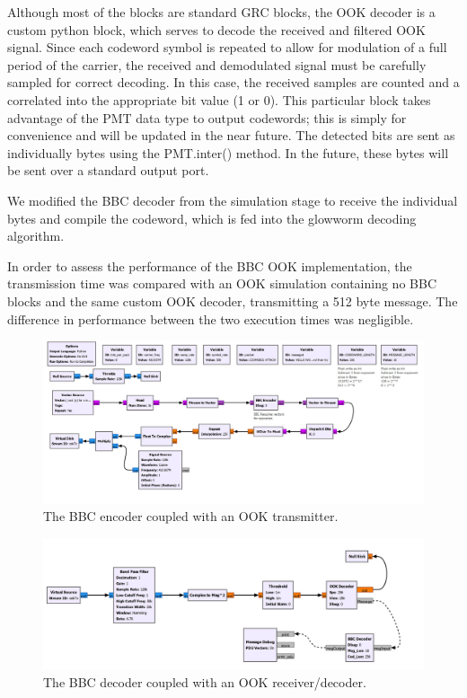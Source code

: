 \documentclass[conference]{IEEEtran}
\begin{document}
{Although most of the blocks are standard GRC blocks, the OOK decoder is a custom python block, which serves to decode the received and filtered OOK signal. Since each codeword symbol is repeated to allow for modulation of a full period of the carrier, the received and demodulated signal must be carefully sampled for correct decoding. In this case, the received samples are counted and a correlated into the appropriate bit value (1 or 0). This particular block takes advantage of the PMT data type to output codewords; this is simply for convenience and will be updated in the near future. The detected bits are sent as individually bytes using the PMT.inter() method. In the future, these bytes will be sent over a standard output port. 

We modified the BBC decoder from the simulation stage to receive the individual bytes and compile the codeword, which is fed into the glowworm decoding algorithm. 

In order to assess the performance of the BBC OOK implementation, the transmission time was compared with an OOK simulation containing no BBC blocks and the same custom OOK decoder, transmitting a 512 byte message. The difference in performance between the two execution times was negligible.


\begin{figure}
    \centering
    \includegraphics[scale=0.25]{./figures/bbc_ook_1}
    \caption{The BBC encoder coupled with an OOK transmitter.}
    \label{fig:bbc_ook_tx}
\end{figure}


\begin{figure}
    \centering
    \includegraphics[scale=0.25]{./figures/bbc_ook_2}
    \caption{The BBC decoder coupled with an OOK receiver/decoder.}
    \label{fig:bbc_ook_rx}
\end{figure}

}
\end{document}
